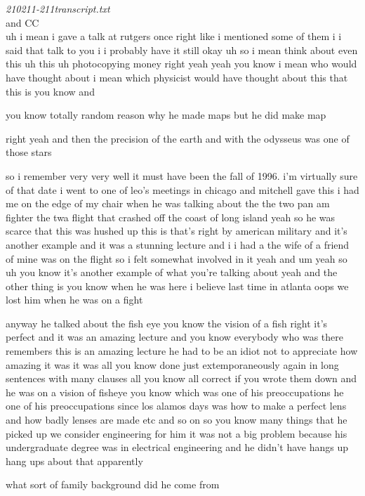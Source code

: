\begin{description}
\emph{210211-211transcript.txt}\\
and
 {CC}\\

uh i mean i gave a talk at rutgers once right like i mentioned some of
them i i said that talk to you i i probably have it still okay uh so i
mean think about even this uh this uh photocopying money right yeah yeah
you know i mean who would have thought about i mean which physicist would
have thought about this that this is you know and

you know totally random
reason why he made maps but he did make map

right yeah and then the
precision of the earth and with the odysseus was one of those stars

so i remember very very well it must have been the fall of 1996. i'm
virtually sure of that date i went to one of leo's meetings in chicago
and mitchell gave this i had me on the edge of my chair when he was
talking about the the two pan am fighter the twa flight that crashed off
the coast of long island yeah so he was scarce that this was hushed up
this is that's right by american military and it's another example and it
was a stunning lecture and i i had a the wife of a friend of mine was on
the flight so i felt somewhat involved in it yeah and um yeah so uh you
know it's another example of what you're talking about yeah and the other
thing is you know when he was here i believe last time in atlanta oops we
lost him when he was on a fight

anyway he talked about the fish eye you know the vision of a fish right
it's perfect and it was an amazing lecture and you know everybody who was
there remembers this is an amazing lecture he had to be an idiot not to
appreciate how amazing it was it was all you know done just
extemporaneously again in long sentences with many clauses all you know
all correct if you wrote them down and he was on a vision of fisheye you
know which was one of his preoccupations he one of his preoccupations
since los alamos days was how to make a perfect lens and how badly lenses
are made etc and so on so you know many things that he picked up we
consider engineering for him it was not a big problem because his
undergraduate degree was in electrical engineering and he didn't have
hangs up hang ups about that apparently

what sort of family background did he come from


\end{description}
